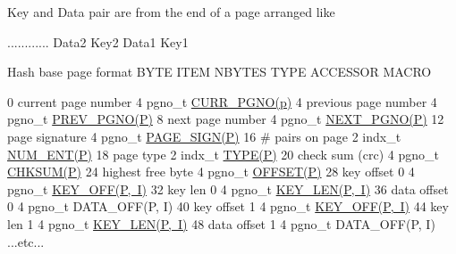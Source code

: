 Key and Data pair are from the end of a page arranged like \begin{DoxyVerb}  ............   Data2   Key2    Data1   Key1
\end{DoxyVerb}


Hash base page format B\+Y\+TE I\+T\+EM N\+B\+Y\+T\+ES T\+Y\+PE A\+C\+C\+E\+S\+S\+OR M\+A\+C\+RO 

 0 current page number 4 pgno\+\_\+t \mbox{\hyperlink{adat-devel_2other__libs_2filedb_2filehash_2ffdb__page_8h_a457153d6443527e77cf6c014418b3f0c}{C\+U\+R\+R\+\_\+\+P\+G\+N\+O(p)}} 4 previous page number 4 pgno\+\_\+t \mbox{\hyperlink{adat-devel_2other__libs_2filedb_2filehash_2ffdb__page_8h_a9f3ec51602d190743b13ac9322bea011}{P\+R\+E\+V\+\_\+\+P\+G\+N\+O(\+P)}} 8 next page number 4 pgno\+\_\+t \mbox{\hyperlink{adat-devel_2other__libs_2filedb_2filehash_2ffdb__page_8h_af1b39c2678bf46751c0a27214c45ac06}{N\+E\+X\+T\+\_\+\+P\+G\+N\+O(\+P)}} 12 page signature 4 pgno\+\_\+t \mbox{\hyperlink{adat-devel_2other__libs_2filedb_2filehash_2ffdb__page_8h_ae3a4cc6ec4e8e6abdeb46e9bc3746a00}{P\+A\+G\+E\+\_\+\+S\+I\+G\+N(\+P)}} 16 \# pairs on page 2 indx\+\_\+t \mbox{\hyperlink{adat-devel_2other__libs_2filedb_2filehash_2ffdb__page_8h_a2c1f890bf697f759dd5f4d7543d3d581}{N\+U\+M\+\_\+\+E\+N\+T(\+P)}} 18 page type 2 indx\+\_\+t \mbox{\hyperlink{adat-devel_2other__libs_2filedb_2filehash_2ffdb__page_8h_aa26538940485245e2d25f34c9438d924}{T\+Y\+P\+E(\+P)}} 20 check sum (crc) 4 pgno\+\_\+t \mbox{\hyperlink{adat-devel_2other__libs_2filedb_2filehash_2ffdb__page_8h_a2afb823434e3edd5930ccde30f1c5e44}{C\+H\+K\+S\+U\+M(\+P)}} 24 highest free byte 4 pgno\+\_\+t \mbox{\hyperlink{adat-devel_2other__libs_2filedb_2filehash_2ffdb__page_8h_a4dbf6956d979a56c436126902acd9f6d}{O\+F\+F\+S\+E\+T(\+P)}} 28 key offset 0 4 pgno\+\_\+t \mbox{\hyperlink{adat-devel_2other__libs_2filedb_2filehash_2ffdb__page_8h_a2be5a2f1fdc94395dce82862134bf2b0}{K\+E\+Y\+\_\+\+O\+F\+F(\+P, I)}} 32 key len 0 4 pgno\+\_\+t \mbox{\hyperlink{adat-devel_2other__libs_2filedb_2filehash_2ffdb__page_8h_ac2adfc4a9b947bdf68b74e2fa883c7f3}{K\+E\+Y\+\_\+\+L\+E\+N(\+P, I)}} 36 data offset 0 4 pgno\+\_\+t D\+A\+T\+A\+\_\+\+O\+F\+F(\+P, I) 40 key offset 1 4 pgno\+\_\+t \mbox{\hyperlink{adat-devel_2other__libs_2filedb_2filehash_2ffdb__page_8h_a2be5a2f1fdc94395dce82862134bf2b0}{K\+E\+Y\+\_\+\+O\+F\+F(\+P, I)}} 44 key len 1 4 pgno\+\_\+t \mbox{\hyperlink{adat-devel_2other__libs_2filedb_2filehash_2ffdb__page_8h_ac2adfc4a9b947bdf68b74e2fa883c7f3}{K\+E\+Y\+\_\+\+L\+E\+N(\+P, I)}} 48 data offset 1 4 pgno\+\_\+t D\+A\+T\+A\+\_\+\+O\+F\+F(\+P, I) ...etc... \mbox{\label{adat-devel_2other__libs_2filedb_2filehash_2ffdb__page_8h_acf7bddf94c7b8dd14d63fe9a16bc1003}} 
